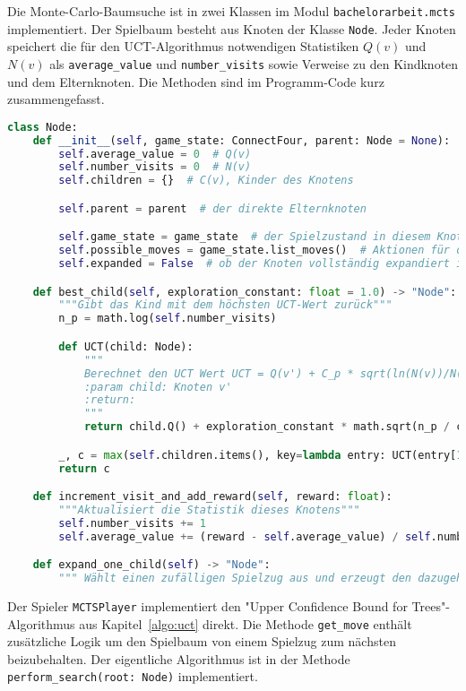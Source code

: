 Die Monte-Carlo-Baumsuche ist in zwei Klassen im Modul \verb|bachelorarbeit.mcts| implementiert.
Der Spielbaum besteht aus Knoten der Klasse \verb|Node|.
Jeder Knoten speichert die für den UCT-Algorithmus notwendigen Statistiken $Q(v)$ und $N(v)$ als \verb|average_value| und \verb|number_visits| sowie Verweise zu den Kindknoten und dem Elternknoten.
Die Methoden sind im Programm-Code kurz zusammengefasst.

\begin{lstlisting}[language=Python,caption=Der Knoten der Monte-Carlo-Baumsuche,label={lst:mcts-node}]
class Node:
    def __init__(self, game_state: ConnectFour, parent: Node = None):
        self.average_value = 0  # Q(v)
        self.number_visits = 0  # N(v)
        self.children = {}  # C(v), Kinder des Knotens

        self.parent = parent  # der direkte Elternknoten

        self.game_state = game_state  # der Spielzustand in diesem Knoten
        self.possible_moves = game_state.list_moves()  # Aktionen für die noch nicht erforschten Kindknoten
        self.expanded = False  # ob der Knoten vollständig expandiert ist

    def best_child(self, exploration_constant: float = 1.0) -> "Node":
        """Gibt das Kind mit dem höchsten UCT-Wert zurück"""
        n_p = math.log(self.number_visits)

        def UCT(child: Node):
            """
            Berechnet den UCT Wert UCT = Q(v') + C_p * sqrt(ln(N(v))/N(v'))
            :param child: Knoten v'
            :return:
            """
            return child.Q() + exploration_constant * math.sqrt(n_p / child.number_visits)

        _, c = max(self.children.items(), key=lambda entry: UCT(entry[1]))
        return c

    def increment_visit_and_add_reward(self, reward: float):
        """Aktualisiert die Statistik dieses Knotens"""
        self.number_visits += 1
        self.average_value += (reward - self.average_value) / self.number_visits

    def expand_one_child(self) -> "Node":
        """ Wählt einen zufälligen Spielzug aus und erzeugt den dazugehörigen Kindknoten"""

\end{lstlisting}

Der Spieler \verb|MCTSPlayer| implementiert den "Upper Confidence Bound for Trees"-Algorithmus aus Kapitel~\ref{algo:uct} direkt.
Die Methode \verb|get_move| enthält zusätzliche Logik um den Spielbaum von einem Spielzug zum nächsten beizubehalten.
Der eigentliche Algorithmus ist in der Methode \verb|perform_search(root: Node)| implementiert.

